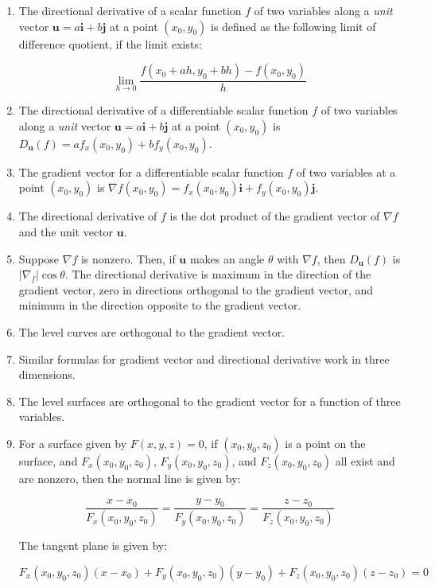 \documentclass[10pt]{amsart}
\begin{document}
\begin{enumerate}
\item The directional derivative of a scalar function
  $f$ of two variables along a {\em unit} vector $\mathbf{u} =
  a\mathbf{i} + b\mathbf{j}$ at a point $(x_0,y_0)$ is defined as the
  following limit of difference quotient, if the limit exists:

  $$\lim_{h \to 0} \frac{f(x_0 + ah, y_0 + bh) - f(x_0,y_0)}{h}$$

\item The directional derivative of a differentiable scalar function
  $f$ of two variables along a {\em unit} vector $\mathbf{u} =
  a\mathbf{i} + b\mathbf{j}$ at a point $(x_0,y_0)$ is
  $D_{\mathbf{u}}(f) = af_x(x_0,y_0) + bf_y(x_0,y_0)$.
\item The gradient vector for a differentiable scalar function $f$ of
  two variables at a point $(x_0,y_0)$ is $\nabla f(x_0,y_0) =
  f_x(x_0,y_0)\mathbf{i} + f_y(x_0,y_0)\mathbf{j}$.
\item The directional derivative of $f$ is the dot product of the
  gradient vector of $\nabla f$ and the unit vector $\mathbf{u}$. 
\item Suppose $\nabla f$ is nonzero. Then, if $\mathbf{u}$ makes an
  angle $\theta$ with $\nabla f$, then $D_{\mathbf{u}}(f)$ is
  $|\nabla_f|\cos \theta$. The directional derivative is maximum in
  the direction of the gradient vector, zero in directions orthogonal
  to the gradient vector, and minimum in the direction opposite to the
  gradient vector.
\item The level curves are orthogonal to the gradient vector.
\item Similar formulas for gradient vector and directional derivative
  work in three dimensions.
\item The level surfaces are orthogonal to the gradient vector for a
  function of three variables.
\item For a surface given by $F(x,y,z) = 0$, if $(x_0,y_0,z_0)$ is a
  point on the surface, and $F_x(x_0,y_0,z_0)$, $F_y(x_0,y_0,z_0)$,
  and $F_z(x_0,y_0,z_0)$ all exist and are nonzero, then the normal
  line is given by:

  $$\frac{x - x_0}{F_x(x_0,y_0,z_0)} = \frac{y - y_0}{F_y(x_0,y_0,z_0)} = \frac{z - z_0}{F_z(x_0,y_0,z_0)}$$

  The tangent plane is given by:

  $$F_x(x_0,y_0,z_0)(x - x_0) + F_y(x_0,y_0,z_0)(y - y_0) + F_z(x_0,y_0,z_0)(z - z_0) = 0$$
\end{enumerate}
\end{document}
